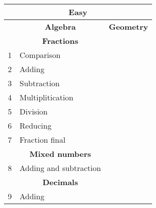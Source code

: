 \documentclass[a4paper]{article}
\begin{document}
\begin{center}

\begin{table}[]
\large
\begin{tabular}{|lll|}
\hline
\multicolumn{3}{|c|}{\textbf{Easy}}                                                                                              \\ \hline
\multicolumn{1}{|l|}{}   & \multicolumn{1}{c|}{\textbf{Algebra}}                  & \multicolumn{1}{c|}{\textbf{Geometry}}       \\ \hline
\multicolumn{1}{|l|}{}   & \multicolumn{1}{c|}{\textbf{Fractions}}                &                                              \\ \hline
\multicolumn{1}{|l|}{1}  & \multicolumn{1}{l|}{Comparison}                        &                                              \\ \hline
\multicolumn{1}{|l|}{2}  & \multicolumn{1}{l|}{Adding}                            &                                              \\ \hline
\multicolumn{1}{|l|}{3}  & \multicolumn{1}{l|}{Subtraction}                       &                                              \\ \hline
\multicolumn{1}{|l|}{4}  & \multicolumn{1}{l|}{Multiplitication}                  &                                              \\ \hline
\multicolumn{1}{|l|}{5}  & \multicolumn{1}{l|}{Division}                          &                                              \\ \hline
\multicolumn{1}{|l|}{6}  & \multicolumn{1}{l|}{Reducing}                          &                                              \\ \hline
\multicolumn{1}{|l|}{7}  & \multicolumn{1}{l|}{Fraction final}                    &                                              \\ \hline
\multicolumn{1}{|l|}{}   & \multicolumn{1}{c|}{\textbf{Mixed numbers}}            &                                              \\ \hline
\multicolumn{1}{|l|}{8}  & \multicolumn{1}{l|}{Adding and subtraction}            &                                              \\ \hline
\multicolumn{1}{|l|}{}   & \multicolumn{1}{c|}{\textbf{Decimals}}                 &                                              \\ \hline
\multicolumn{1}{|l|}{9}  & \multicolumn{1}{l|}{Adding}                            &                                              \\ \hline

\end{tabular}
\end{table}
\end{center}
\end{document}
